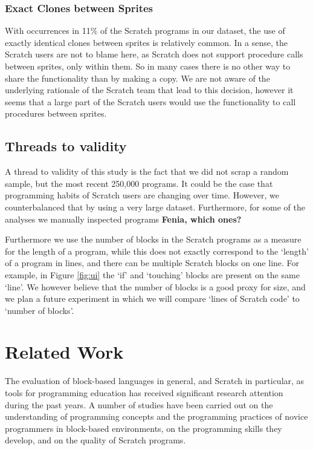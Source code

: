\documentclass{sig-alternate}
\newcommand{\todo}[1]{\textbf{#1}}
\begin{document}
\subsubsection{Exact Clones between Sprites}
With occurrences in 11\% of the Scratch programs in our dataset, the use of exactly identical clones between sprites is relatively common. In a sense, the Scratch users are not to blame here, as Scratch does not support procedure calls between sprites, only within them. So in many cases there is no other way to share the functionality than by making a copy. We are not aware of the underlying rationale of the Scratch team that lead to this decision, however it seems that a large part of the Scratch users would use the functionality to call procedures between sprites.


\subsection{Threads to validity}
A thread to validity of this study is the fact that we did not scrap a random sample, but the most recent 250,000 programs. It could be the case that programming habits of Scratch users are changing over time. However, we counterbalanced that by using a very large dataset. Furthermore, for some of the analyses we manually inspected programs \todo{Fenia, which ones?}

Furthermore we use the number of blocks in the Scratch programs as a measure for the length of a program, while this does not exactly correspond to the `length' of a program in lines, and there can be multiple Scratch blocks on one line. For example, in Figure \ref{fig:ui} the `if' and `touching' blocks are present on the same `line'. We however believe that the number of blocks is a good proxy for size, and we plan a future experiment in which we will compare `lines of Scratch code' to `number of blocks'.


\section{Related Work}
\label{sec:related}

The evaluation of block-based languages in general, and Scratch in particular, as tools for programming education has received significant research attention during the past years. A number of studies have been carried out on the understanding of programming concepts and the programming practices of novice programmers in block-based environments, on the programming skills they develop, and on the quality of Scratch programs.
\end{document}
